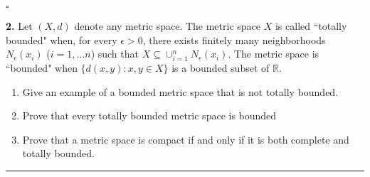 \documentclass{article}
\begin{document}
\hfill $\square$




\newpage


\noindent \textbf{2.}  Let $(X,d)$ denote any metric space.  The metric space $X$ is called ``totally bounded" when,  for every $\epsilon > 0$,   there exists finitely many neighborhoods $N_\epsilon ( x_i )$  ($i=1,\ldots n$)
such that $X \subseteq \cup_{i=1}^n N_\epsilon ( x_i ) $.  The metric space is ``bounded" when $\{d(x,y): x,y \in X \}$ is a bounded subset of $\mathbb{R}$.
\begin{enumerate}
	\item  Give an example of a bounded metric space that is not totally bounded.
	\item  Prove that every totally bounded metric space is bounded
	\item  Prove that a metric space is compact if and only if it is both complete and totally bounded.
\end{enumerate}

\hrule
\end{document}
